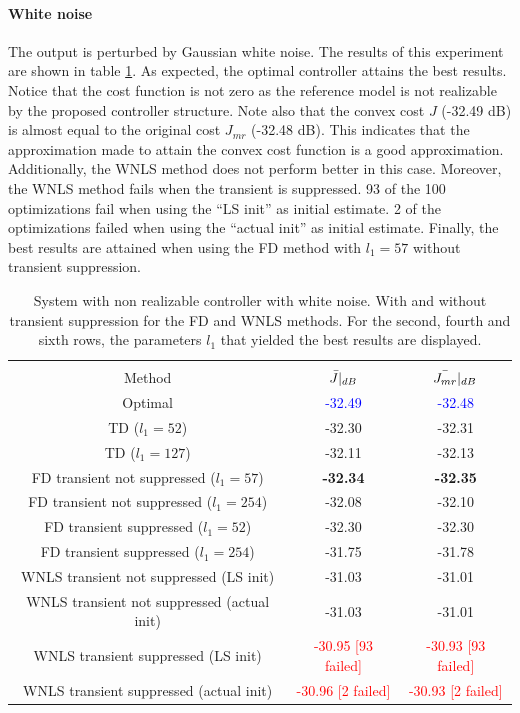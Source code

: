 \paragraph{White noise}
The output is perturbed by Gaussian white noise. The results of this experiment are shown in table \ref{tab:non_realizable_white_transient_with_without_TD_vs_FD_vs_WNLS}. As expected, the optimal controller attains the best results. Notice that the cost function is not zero as the reference model is not realizable by the proposed controller structure. Note also that the convex cost $J$ (-32.49 dB) is almost equal to the original cost $J_{mr}$ (-32.48 dB). This indicates that the approximation made to attain the convex cost function is a good approximation. Additionally, the WNLS method does not perform better in this case. Moreover, the WNLS method fails when the transient is suppressed. 93 of the 100 optimizations fail when using the ``LS init'' as initial estimate. 2 of the optimizations failed when using the ``actual init'' as initial estimate. Finally, the best results are attained when using the FD method with $l_1 =  57$ without transient suppression.

\begin{table}[H]
\centering
\begin{tabular}{|ccc|}
\hline
&&\\[-2.5ex]
Method & $\Bar{J}|_{dB}$ & $\Bar{J_{mr}}|_{dB}$ \\
\hline
Optimal                                     & \textcolor{blue}{-32.49} & \textcolor{blue}{-32.48} \\
TD ($l_1 = 52$)                               & -32.30 & -32.31 \\
TD ($l_1 = 127$)                            & -32.11 & -32.13 \\
FD transient not suppressed ($l_1 = 57$)      & \textbf{-32.34} & \textbf{-32.35} \\
FD transient not suppressed ($l_1 = 254$)   & -32.08 & -32.10 \\
FD transient suppressed ($l_1 = 52$)          & -32.30 & -32.30 \\
FD transient suppressed ($l_1 = 254$)       & -31.75 & -31.78 \\
WNLS transient not suppressed (LS init)     & -31.03 & -31.01 \\
WNLS transient not suppressed (actual init) & -31.03 & -31.01 \\
WNLS transient suppressed (LS init)         & \textcolor{red}{-30.95 [93 failed]}    & \textcolor{red}{-30.93 [93 failed]}    \\
WNLS transient suppressed (actual init)     & \textcolor{red}{-30.96 [2 failed]} & \textcolor{red}{-30.93 [2 failed]} \\

\hline
\end{tabular}
\caption{System with non realizable controller with white noise. With and without transient suppression for the FD and WNLS methods. For the second, fourth and sixth rows, the parameters $l_1$ that yielded the best results are displayed.}
\label{tab:non_realizable_white_transient_with_without_TD_vs_FD_vs_WNLS}
\end{table}

